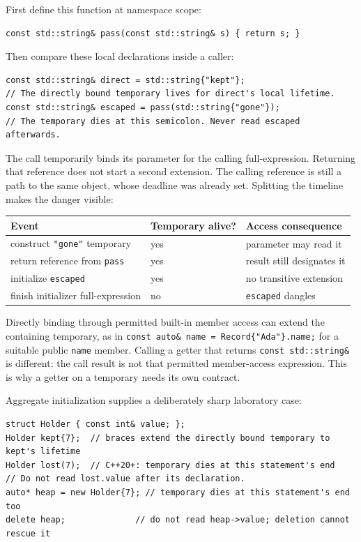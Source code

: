 First define this function at namespace scope:

\begin{verbatim}
const std::string& pass(const std::string& s) { return s; }
\end{verbatim}

Then compare these local declarations inside a caller:

\begin{verbatim}
const std::string& direct = std::string{"kept"};
// The directly bound temporary lives for direct's local lifetime.
const std::string& escaped = pass(std::string{"gone"});
// The temporary dies at this semicolon. Never read escaped afterwards.
\end{verbatim}

The call temporarily binds its parameter for the calling full-expression. Returning that reference does not start a second extension. The calling reference is still a path to the same object, whose deadline was already set. Splitting the timeline makes the danger visible:

{\def\LTcaptype{none} %
\begin{longtable}[]{@{}lll@{}}
\toprule\noalign{}
Event & Temporary alive? & Access consequence \\
\midrule\noalign{}
\endhead
\bottomrule\noalign{}
\endlastfoot
construct \texttt{"gone"} temporary & yes & parameter may read it \\
return reference from \texttt{pass} & yes & result still designates it \\
initialize \texttt{escaped} & yes & no transitive extension \\
finish initializer full-expression & no & \texttt{escaped} dangles \\
\end{longtable}
}

Directly binding through permitted built-in member access can extend the containing temporary, as in \texttt{const\ auto\&\ name\ =\ Record\{"Ada"\}.name;} for a suitable public \texttt{name} member. Calling a getter that returns \texttt{const\ std::string\&} is different: the call result is not that permitted member-access expression. This is why a getter on a temporary needs its own contract.

Aggregate initialization supplies a deliberately sharp laboratory case:

\begin{verbatim}
struct Holder { const int& value; };
Holder kept{7};  // braces extend the directly bound temporary to kept's lifetime
Holder lost(7);  // C++20+: temporary dies at this statement's end
// Do not read lost.value after its declaration.
auto* heap = new Holder{7}; // temporary dies at this statement's end too
delete heap;              // do not read heap->value; deletion cannot rescue it
\end{verbatim}


